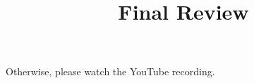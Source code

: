 

\title{Final Review}



\begin{frame}
  \titlepage
\end{frame}

\begin{slide}
  

  Otherwise, please watch the YouTube recording.

\end{slide}


